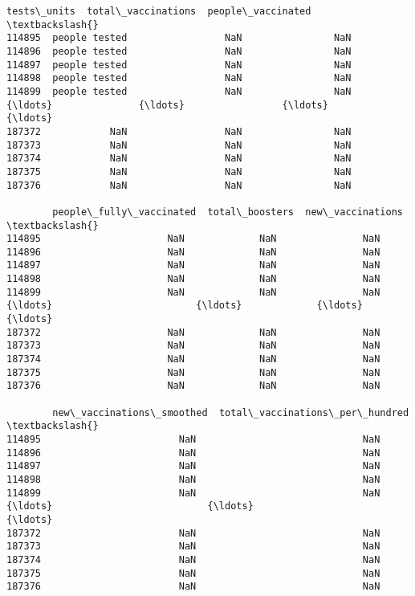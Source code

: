 \documentclass[11pt]{article}
\begin{document}
\begin{tcolorbox}[breakable, size=fbox, boxrule=.5pt, pad at break*=1mm, opacityfill=0]
\begin{Verbatim}[commandchars=\\\{\}]
          tests\_units  total\_vaccinations  people\_vaccinated  \textbackslash{}
114895  people tested                 NaN                NaN
114896  people tested                 NaN                NaN
114897  people tested                 NaN                NaN
114898  people tested                 NaN                NaN
114899  people tested                 NaN                NaN
{\ldots}               {\ldots}                 {\ldots}                {\ldots}
187372            NaN                 NaN                NaN
187373            NaN                 NaN                NaN
187374            NaN                 NaN                NaN
187375            NaN                 NaN                NaN
187376            NaN                 NaN                NaN

        people\_fully\_vaccinated  total\_boosters  new\_vaccinations  \textbackslash{}
114895                      NaN             NaN               NaN
114896                      NaN             NaN               NaN
114897                      NaN             NaN               NaN
114898                      NaN             NaN               NaN
114899                      NaN             NaN               NaN
{\ldots}                         {\ldots}             {\ldots}               {\ldots}
187372                      NaN             NaN               NaN
187373                      NaN             NaN               NaN
187374                      NaN             NaN               NaN
187375                      NaN             NaN               NaN
187376                      NaN             NaN               NaN

        new\_vaccinations\_smoothed  total\_vaccinations\_per\_hundred  \textbackslash{}
114895                        NaN                             NaN
114896                        NaN                             NaN
114897                        NaN                             NaN
114898                        NaN                             NaN
114899                        NaN                             NaN
{\ldots}                           {\ldots}                             {\ldots}
187372                        NaN                             NaN
187373                        NaN                             NaN
187374                        NaN                             NaN
187375                        NaN                             NaN
187376                        NaN                             NaN


\end{Verbatim}
\end{tcolorbox}
\end{document}

